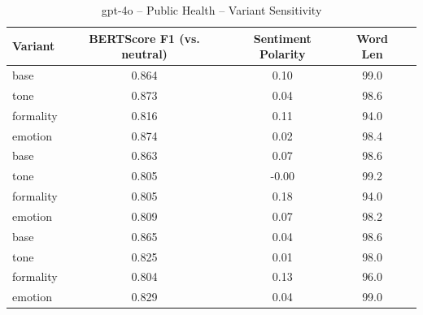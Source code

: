 \documentclass[12pt,a4paper]{article}
\begin{document}
\begin{table}[h]
\centering
\caption{gpt-4o – Public Health – Variant Sensitivity}
\label{tab:gpt-4o_Public_Health}
\begin{tabular}{lccc p{6cm}}
\toprule
Variant & BERTScore F1 (vs. neutral) & Sentiment Polarity & Word Len \\
\midrule
base & 0.864 & 0.10 & 99.0 \\
tone & 0.873 & 0.04 & 98.6 \\
formality & 0.816 & 0.11 & 94.0 \\
emotion & 0.874 & 0.02 & 98.4 \\
base & 0.863 & 0.07 & 98.6 \\
tone & 0.805 & -0.00 & 99.2 \\
formality & 0.805 & 0.18 & 94.0 \\
emotion & 0.809 & 0.07 & 98.2 \\
base & 0.865 & 0.04 & 98.6 \\
tone & 0.825 & 0.01 & 98.0 \\
formality & 0.804 & 0.13 & 96.0 \\
emotion & 0.829 & 0.04 & 99.0 \\
\bottomrule
\end{tabular}
\end{table}
\end{document}
